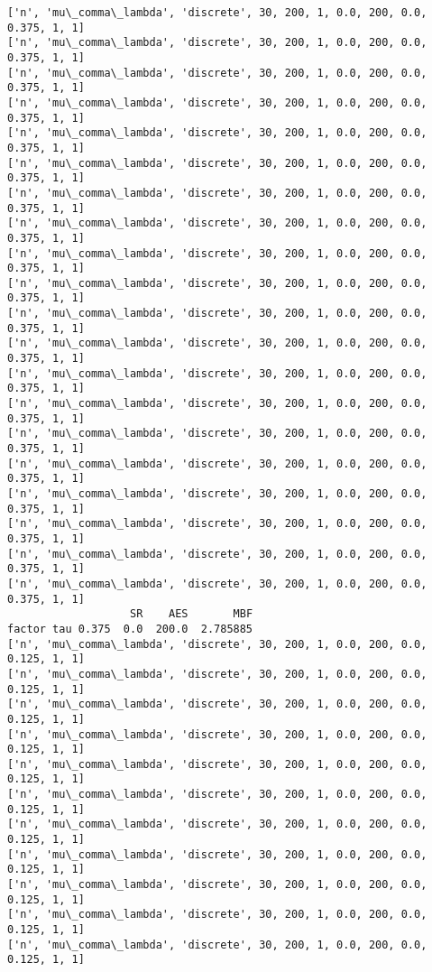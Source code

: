\documentclass[11pt]{article}
\begin{document}
    \begin{Verbatim}[commandchars=\\\{\}]
['n', 'mu\_comma\_lambda', 'discrete', 30, 200, 1, 0.0, 200, 0.0, 0.375, 1, 1]
['n', 'mu\_comma\_lambda', 'discrete', 30, 200, 1, 0.0, 200, 0.0, 0.375, 1, 1]
['n', 'mu\_comma\_lambda', 'discrete', 30, 200, 1, 0.0, 200, 0.0, 0.375, 1, 1]
['n', 'mu\_comma\_lambda', 'discrete', 30, 200, 1, 0.0, 200, 0.0, 0.375, 1, 1]
['n', 'mu\_comma\_lambda', 'discrete', 30, 200, 1, 0.0, 200, 0.0, 0.375, 1, 1]
['n', 'mu\_comma\_lambda', 'discrete', 30, 200, 1, 0.0, 200, 0.0, 0.375, 1, 1]
['n', 'mu\_comma\_lambda', 'discrete', 30, 200, 1, 0.0, 200, 0.0, 0.375, 1, 1]
['n', 'mu\_comma\_lambda', 'discrete', 30, 200, 1, 0.0, 200, 0.0, 0.375, 1, 1]
['n', 'mu\_comma\_lambda', 'discrete', 30, 200, 1, 0.0, 200, 0.0, 0.375, 1, 1]
['n', 'mu\_comma\_lambda', 'discrete', 30, 200, 1, 0.0, 200, 0.0, 0.375, 1, 1]
['n', 'mu\_comma\_lambda', 'discrete', 30, 200, 1, 0.0, 200, 0.0, 0.375, 1, 1]
['n', 'mu\_comma\_lambda', 'discrete', 30, 200, 1, 0.0, 200, 0.0, 0.375, 1, 1]
['n', 'mu\_comma\_lambda', 'discrete', 30, 200, 1, 0.0, 200, 0.0, 0.375, 1, 1]
['n', 'mu\_comma\_lambda', 'discrete', 30, 200, 1, 0.0, 200, 0.0, 0.375, 1, 1]
['n', 'mu\_comma\_lambda', 'discrete', 30, 200, 1, 0.0, 200, 0.0, 0.375, 1, 1]
['n', 'mu\_comma\_lambda', 'discrete', 30, 200, 1, 0.0, 200, 0.0, 0.375, 1, 1]
['n', 'mu\_comma\_lambda', 'discrete', 30, 200, 1, 0.0, 200, 0.0, 0.375, 1, 1]
['n', 'mu\_comma\_lambda', 'discrete', 30, 200, 1, 0.0, 200, 0.0, 0.375, 1, 1]
['n', 'mu\_comma\_lambda', 'discrete', 30, 200, 1, 0.0, 200, 0.0, 0.375, 1, 1]
['n', 'mu\_comma\_lambda', 'discrete', 30, 200, 1, 0.0, 200, 0.0, 0.375, 1, 1]
                   SR    AES       MBF
factor tau 0.375  0.0  200.0  2.785885
['n', 'mu\_comma\_lambda', 'discrete', 30, 200, 1, 0.0, 200, 0.0, 0.125, 1, 1]
['n', 'mu\_comma\_lambda', 'discrete', 30, 200, 1, 0.0, 200, 0.0, 0.125, 1, 1]
['n', 'mu\_comma\_lambda', 'discrete', 30, 200, 1, 0.0, 200, 0.0, 0.125, 1, 1]
['n', 'mu\_comma\_lambda', 'discrete', 30, 200, 1, 0.0, 200, 0.0, 0.125, 1, 1]
['n', 'mu\_comma\_lambda', 'discrete', 30, 200, 1, 0.0, 200, 0.0, 0.125, 1, 1]
['n', 'mu\_comma\_lambda', 'discrete', 30, 200, 1, 0.0, 200, 0.0, 0.125, 1, 1]
['n', 'mu\_comma\_lambda', 'discrete', 30, 200, 1, 0.0, 200, 0.0, 0.125, 1, 1]
['n', 'mu\_comma\_lambda', 'discrete', 30, 200, 1, 0.0, 200, 0.0, 0.125, 1, 1]
['n', 'mu\_comma\_lambda', 'discrete', 30, 200, 1, 0.0, 200, 0.0, 0.125, 1, 1]
['n', 'mu\_comma\_lambda', 'discrete', 30, 200, 1, 0.0, 200, 0.0, 0.125, 1, 1]
['n', 'mu\_comma\_lambda', 'discrete', 30, 200, 1, 0.0, 200, 0.0, 0.125, 1, 1]

\end{Verbatim}
\end{document}
